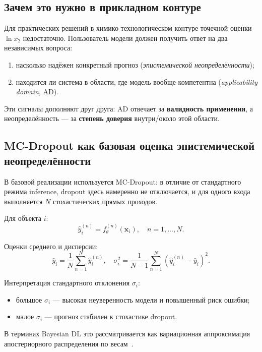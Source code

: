\documentclass[11pt]{article}
\begin{document}
\subsection{Зачем это нужно в прикладном контуре}

Для практических решений в химико-технологическом контуре точечной оценки $\ln x_2$ недостаточно. Пользователь модели должен получить ответ на два независимых вопроса:
\begin{enumerate}
  \item насколько надёжен конкретный прогноз (\textit{эпистемической неопределённости});
  \item находится ли система в области, где модель вообще компетентна (\textit{applicability domain}, AD).
\end{enumerate}

Эти сигналы дополняют друг друга: AD отвечает за \textbf{валидность применения}, а неопределённость --- за \textbf{степень доверия} внутри/около этой области.

\subsection{MC-Dropout как базовая оценка эпистемической неопределённости}

В базовой реализации используется MC-Dropout: в отличие от стандартного режима inference, dropout здесь намеренно не отключается, и для одного входа выполняется $N$ стохастических прямых проходов.

Для объекта $i$:
\begin{equation*}
\hat{y}_i^{(n)} = f_{\theta}^{(n)}(\mathbf{x}_i), \quad n = 1,\ldots,N.
\end{equation*}

Оценки среднего и дисперсии:
\begin{equation*}
\bar{y}_i = \frac{1}{N}\sum_{n=1}^{N}\hat{y}_i^{(n)}, \quad
\sigma_i^2 = \frac{1}{N-1}\sum_{n=1}^{N}\left(\hat{y}_i^{(n)} - \bar{y}_i\right)^2.
\end{equation*}

Интерпретация стандартного отклонения $\sigma_i$:
\begin{itemize}
  \item большое $\sigma_i$ --- высокая неуверенность модели и повышенный риск ошибки;
  \item малое $\sigma_i$ --- прогноз стабилен к стохастике dropout.
\end{itemize}

В терминах Bayesian DL это рассматривается как вариационная аппроксимация апостериорного распределения по весам~\cite{gal2016}.
\end{document}
